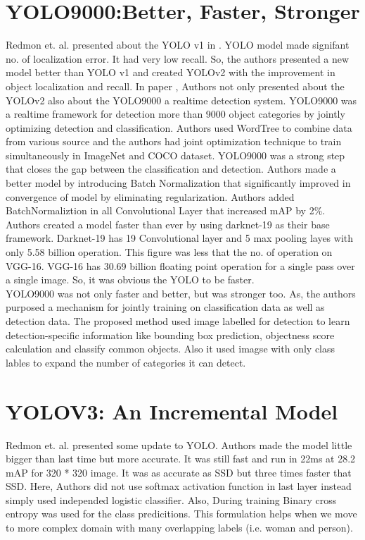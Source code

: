     \section{YOLO9000:Better, Faster, Stronger }
        Redmon et. al. presented about the YOLO v1 in \cite{redmon2016you}. YOLO model made signifant no. of localization error. It had very low recall. So, the authors presented a new model better than YOLO v1 and created YOLOv2 with the improvement in object localization and recall. In paper \cite{redmon2017yolo9000}, Authors not only presented about the YOLOv2 also about the YOLO9000 a realtime detection system. YOLO9000 was a realtime framework for detection more than 9000 object categories by jointly optimizing detection and classification. Authors used WordTree to combine data from various source and the authors had joint optimization technique to train simultaneously in ImageNet and COCO dataset. YOLO9000 was a strong step that closes the gap between the classification and detection.
        Authors made a better model by introducing Batch Normalization that significantly improved in convergence of model by eliminating regularization. Authors added BatchNormaliztion in all Convolutional Layer that increased mAP by 2\%. \\
        Authors created a model faster than ever by using darknet-19 as their base framework. Darknet-19 has 19 Convolutional layer and 5 max pooling layes with only 5.58 billion operation. This figure was less that the no. of operation on VGG-16. VGG-16 has 30.69 billion floating point operation for a single pass over a single image. So, it was obvious the YOLO to be faster.\\ 
        YOLO9000 was not only faster and better, but was stronger too. As, the authors purposed a mechanism for jointly training on classification data as well as detection data. The proposed method used image labelled for detection to learn detection-specific information like bounding box prediction, objectness score calculation and classify common objects. Also it used imagse with only class lables to expand the number of categories it can detect.
    \section{YOLOV3: An Incremental Model}
        Redmon et. al.\cite{redmon2018yolov3} presented some update to YOLO. Authors made the model little bigger than last time but more accurate. It was still fast and run in 22ms at 28.2 mAP for 320 * 320 image. It was as accurate as SSD but three times faster that SSD. Here, Authors did not use softmax activation function in last layer instead simply used independed logistic classifier. Also, During training Binary cross entropy was used for the class predicitions. This formulation helps when we move to more complex domain with many overlapping labels (i.e. woman and person).

